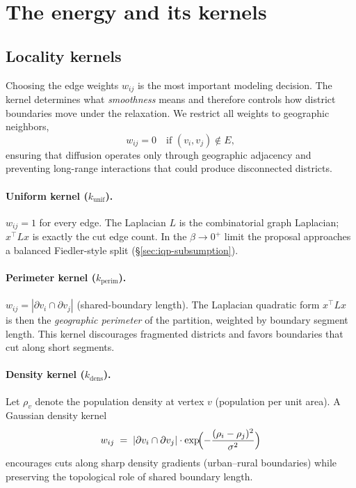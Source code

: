\documentclass[11pt]{article}
\begin{document}
\section{The energy and its kernels}\label{sec:model}

\subsection{Locality kernels}\label{sec:kernels}

Choosing the edge weights $w_{ij}$ is the most important modeling
decision. The kernel determines what \emph{smoothness} means and
therefore controls how district boundaries move under the relaxation.
We restrict all weights to geographic neighbors,
\begin{equation}\label{eq:kernel-local}
  w_{ij} = 0 \quad \text{if } (v_i, v_j) \notin E,
\end{equation}
ensuring that diffusion operates only through geographic adjacency and
preventing long-range interactions that could produce disconnected
districts.

\paragraph{Uniform kernel ($k_{\mathrm{unif}}$).} $w_{ij} = 1$ for
every edge. The Laplacian $L$ is the combinatorial graph Laplacian;
$x^\top L x$ is exactly the cut edge count. In the $\beta \to 0^+$
limit the proposal approaches a balanced Fiedler-style split
(\S\ref{sec:iqp-subsumption}).

\paragraph{Perimeter kernel ($k_{\mathrm{perim}}$).} $w_{ij} = |\partial v_i \cap \partial v_j|$
(shared-boundary length). The Laplacian quadratic form $x^\top L x$
is then the \emph{geographic perimeter} of the partition, weighted by
boundary segment length. This kernel discourages fragmented districts
and favors boundaries that cut along short segments.

\paragraph{Density kernel ($k_{\mathrm{dens}}$).} Let $\rho_v$ denote
the population density at vertex $v$ (population per unit area). A
Gaussian density kernel
\[
  w_{ij} \;=\; |\partial v_i \cap \partial v_j| \cdot
  \exp\!\Bigl( -\frac{(\rho_i - \rho_j)^2}{\sigma^2} \Bigr)
\]
encourages cuts along sharp density gradients (urban--rural
boundaries) while preserving the topological role of shared boundary
length.
\end{document}
